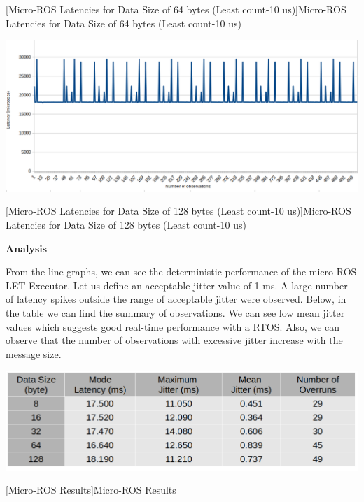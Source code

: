 \documentclass[%
xelatex,
	oneside,		%
	12pt,			%
	parskip=half,	%
	abstracton,
	chapterprefix=true%
    appendixprefix=true]
{scrbook}
\begin{document}
\begin{itemize}
\begin{center}
[Micro-ROS Latencies for Data Size of 64 bytes (Least count-10 us)]{Micro-ROS Latencies for Data Size of 64 bytes (Least count-10 us)}
\label{fig:uros64byte}
\end{center}

\begin{center}
\includegraphics[scale=0.32]{fig/uros128byte.png}

[Micro-ROS Latencies for Data Size of 128 bytes (Least count-10 us)]{Micro-ROS Latencies for Data Size of 128 bytes (Least count-10 us)}
\label{fig:uros128byte}
\end{center}
\end{itemize}
{\bfseries Analysis}


\vspace*{0.5cm}
From the line graphs, we can see the deterministic performance of the micro-ROS LET Executor. Let us define an acceptable jitter value of 1 ms. A large number of latency spikes outside the range of acceptable jitter were observed. Below, in the table we can find the summary of observations. We can see low mean jitter values which suggests good real-time performance with a RTOS. Also, we can observe that the number of observations with excessive jitter increase with the message size.
\begin{center}
\includegraphics[scale=0.4]{fig/urosfinaldata.png}

[Micro-ROS Results]{Micro-ROS Results}
\label{tab:urosfinaldata}
\end{center}
		
\end{document}

